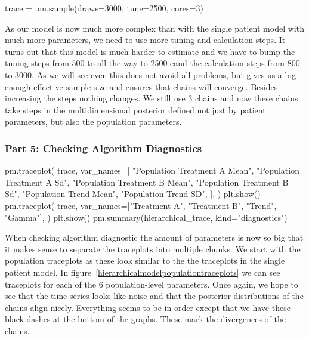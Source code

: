 \documentclass[12pt,a4paper,leqno]{report}
\theoremstyle{plain}
\theoremstyle{definition}
\theoremstyle{remark}
\begin{document}
\bigskip
\begin{pyverbatim}[][fontsize=\footnotesize]
    trace = pm.sample(draws=3000, tune=2500, cores=3)
\end{pyverbatim}
\bigskip

As our model is now much more complex than with the single patient model with much
more parameters, we need to use more tuning and calculation steps. It turns out that this model is
much harder to estimate and we have to bump the tuning steps from 500 to all the way to
2500 eand the calculation steps from 800 to 3000. As we will see even this does not
avoid all problems, but gives us a big enough effective sample size and ensures that
chains will converge. Besides increasing the steps nothing changes. We still use 3
chains and now these chains take steps in the multidimensional posterior defined not
just by patient parameters, but also the population parameters.

\subsubsection*{Part 5: Checking Algorithm Diagnostics}

\bigskip
\begin{pyverbatim}[][fontsize=\footnotesize]
    pm.traceplot(
        trace,
        var_names=[
            "Population Treatment A Mean",
            "Population Treatment A Sd",
            "Population Treatment B Mean",
            "Population Treatment B Sd",
            "Population Trend Mean",
            "Population Trend SD",
        ],
    )
    plt.show()
    pm.traceplot(
        trace,
        var_names=["Treatment A", "Treatment B", "Trend", "Gamma"],
    )
    plt.show()
    pm.summary(hierarchical_trace, kind="diagnostics")
\end{pyverbatim}
\bigskip

When checking algorithm diagnostic the amount of parameters is now so big that it makes
sense to separate the traceplots into multiple chunks. We start with the population
traceplots as these look similar to the the traceplots in the single patient
model. In figure\ \ref{hierarchicalmodelpopulationtraceplots} we can see traceplots for each of
the 6 population-level parameters. Once again, we hope to see that the time series looks
like noise and that the posterior distributions of the chains align nicely. Everything
seems to be in order except that we have these black dashes at the bottom of the graphs.
These mark the divergences of the chains.
\end{document}
